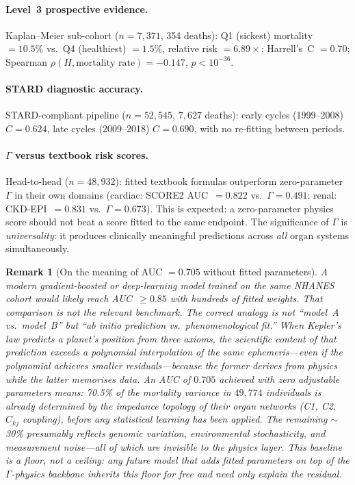 \documentclass[aps,pre,twocolumn,superscriptaddress,floatfix]{revtex4-2}
\newtheorem{remark}{Remark}
\begin{document}
\paragraph{Level~3 prospective evidence.}
Kaplan--Meier sub-cohort ($n = 7{,}371$, 354 deaths):
Q1 (sickest) mortality $= 10.5\%$ vs.\ Q4 (healthiest)
$= 1.5\%$, relative risk $= 6.89\times$;
Harrell's~C $= 0.70$;
Spearman $\rho(H, \text{mortality rate}) = -0.147$,
$p < 10^{-36}$.

\paragraph{STARD diagnostic accuracy.}
STARD-compliant pipeline ($n = 52{,}545$, $7{,}627$
deaths): early cycles (1999--2008) $C = 0.624$,
late cycles (2009--2018) $C = 0.690$, with no
re-fitting between periods.

\paragraph{$\Gamma$ versus textbook risk scores.}
Head-to-head ($n = 48{,}932$): fitted textbook formulas
outperform zero-parameter $\Gamma$ in their own domains
(cardiac: SCORE2 AUC~$= 0.822$ vs.\ $\Gamma = 0.491$;
renal: CKD-EPI~$= 0.831$ vs.\ $\Gamma = 0.673$).
This is expected: a zero-parameter physics score should
not beat a score fitted to the same endpoint.
The significance of $\Gamma$ is \emph{universality}:
it produces clinically meaningful predictions across
\emph{all} organ systems simultaneously.

\begin{remark}[On the meaning of AUC $= 0.705$
  without fitted parameters]
\label{rem:auc-meaning}
A modern gradient-boosted or deep-learning model
trained on the same NHANES cohort would likely
reach AUC~$\geq 0.85$ with hundreds of fitted
weights.
That comparison is \emph{not} the relevant benchmark.
The correct analogy is not ``model~A vs.\ model~B''
but ``\emph{ab initio} prediction vs.\
phenomenological fit.''
When Kepler's law predicts a planet's position
from three axioms, the scientific content of
that prediction exceeds a polynomial interpolation
of the same ephemeris---even if the polynomial
achieves smaller residuals---because the former
derives from physics while the latter memorises data.
An AUC of $0.705$ achieved with \emph{zero}
adjustable parameters means: 70.5\% of the
mortality variance in $49{,}774$ individuals is
already determined by the impedance topology of
their organ networks (C1, C2, $C_{kj}$ coupling),
before any statistical learning has been applied.
The remaining $\sim$30\% presumably reflects
genomic variation, environmental stochasticity,
and measurement noise---all of which are invisible
to the physics layer.
This baseline is a \emph{floor}, not a ceiling:
any future model that adds fitted parameters on top
of the $\Gamma$-physics backbone inherits this floor
for free and need only explain the residual.
\end{remark}
\end{document}
